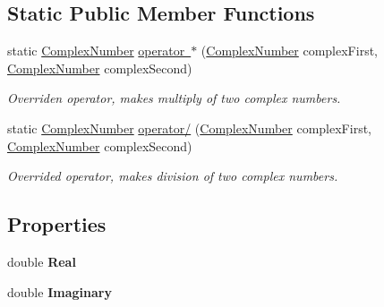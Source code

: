 \subsection*{Static Public Member Functions}
\begin{DoxyCompactItemize}
\item 
static \mbox{\hyperlink{class_home_work_1_1_task_library_1_1_tasks_1_1_lesson1_1_1_classes_1_1_complex_number}{Complex\+Number}} \mbox{\hyperlink{class_home_work_1_1_task_library_1_1_tasks_1_1_lesson1_1_1_classes_1_1_complex_number_ae693b757b343c8c6a8d3cc1f11619aca}{operator $\ast$}} (\mbox{\hyperlink{class_home_work_1_1_task_library_1_1_tasks_1_1_lesson1_1_1_classes_1_1_complex_number}{Complex\+Number}} complex\+First, \mbox{\hyperlink{class_home_work_1_1_task_library_1_1_tasks_1_1_lesson1_1_1_classes_1_1_complex_number}{Complex\+Number}} complex\+Second)
\begin{DoxyCompactList}\small\item\em Overriden operator, makes multiply of two complex numbers. \end{DoxyCompactList}\item 
static \mbox{\hyperlink{class_home_work_1_1_task_library_1_1_tasks_1_1_lesson1_1_1_classes_1_1_complex_number}{Complex\+Number}} \mbox{\hyperlink{class_home_work_1_1_task_library_1_1_tasks_1_1_lesson1_1_1_classes_1_1_complex_number_a7e8afa463d2d87d0f2e035fb2e3ed35b}{operator/}} (\mbox{\hyperlink{class_home_work_1_1_task_library_1_1_tasks_1_1_lesson1_1_1_classes_1_1_complex_number}{Complex\+Number}} complex\+First, \mbox{\hyperlink{class_home_work_1_1_task_library_1_1_tasks_1_1_lesson1_1_1_classes_1_1_complex_number}{Complex\+Number}} complex\+Second)
\begin{DoxyCompactList}\small\item\em Overrided operator, makes division of two complex numbers. \end{DoxyCompactList}\end{DoxyCompactItemize}
\subsection*{Properties}
\begin{DoxyCompactItemize}
\item 
\mbox{\label{class_home_work_1_1_task_library_1_1_tasks_1_1_lesson1_1_1_classes_1_1_complex_number_a349c96b20488c3b4814645bdd7a5de0d}} 
double {\bfseries Real}
\item 
\mbox{\label{class_home_work_1_1_task_library_1_1_tasks_1_1_lesson1_1_1_classes_1_1_complex_number_a48d09427476d8805828c899e7ebb5e0f}} 
double {\bfseries Imaginary}
\end{DoxyCompactItemize}


